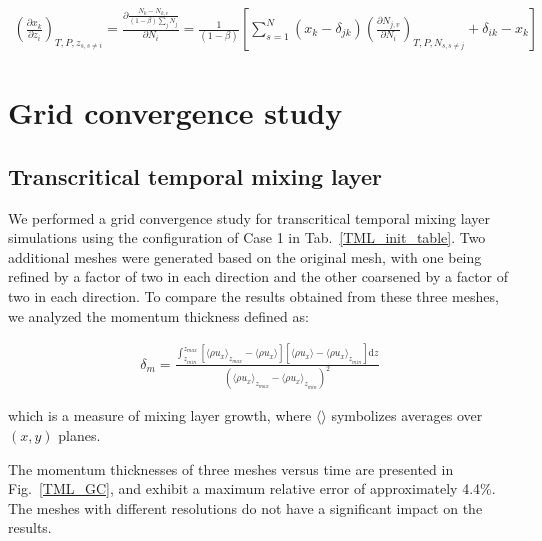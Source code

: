 
\begin{align}\left(\frac{\partial x_k}{\partial z_i}\right)_{T,P,z_{s,s\neq i}}= \frac{\partial \frac{N_k-N_{k,v}} { (1-\beta) \sum_j N_j}}{\partial N_i} = \frac{1}{(1-\beta) } \left[\sum_{s=1}^N\left(x_k - \delta _{jk}\right)\left(\frac{\partial N_{j,v}}{\partial N_i}\right)_{T,P,N_{s,s\neq j}}+\delta_{ik}-x_k\right]
\end{align}

\section{Grid convergence study} 


\subsection{Transcritical temporal mixing layer} 
\label{App:TML}

We performed a grid convergence study for transcritical temporal mixing layer simulations using the configuration of Case 1 in Tab.~\ref{TML_init_table}. Two additional meshes were generated based on the original mesh, with one being refined by a factor of two in each direction and the other coarsened by a factor of two in each direction. To compare the results obtained from these three meshes, we analyzed the momentum thickness defined as:

\begin{align}
\delta_m = \frac{\displaystyle\int_{z_{min}}^{z_{max}}\left[\langle \rho u_x \rangle_{z_{max}} - \langle \rho u_x \rangle\right]\left[\langle \rho u_x \rangle - \langle \rho u_x \rangle_{z_{min}}\right]\mathrm{d}z}{\left(\langle \rho u_x \rangle_{z_{max}} - \langle \rho u_x \rangle_{z_{min}}\right)^2}
\end{align}

which is a measure of mixing layer growth, where $\langle\rangle$ symbolizes averages over $(x,y)$ planes.

The momentum thicknesses of three meshes versus time are presented in Fig.~\ref{TML_GC}, and exhibit a maximum relative error of approximately 4.4\%. The meshes with different resolutions do not have a significant impact on the results.


